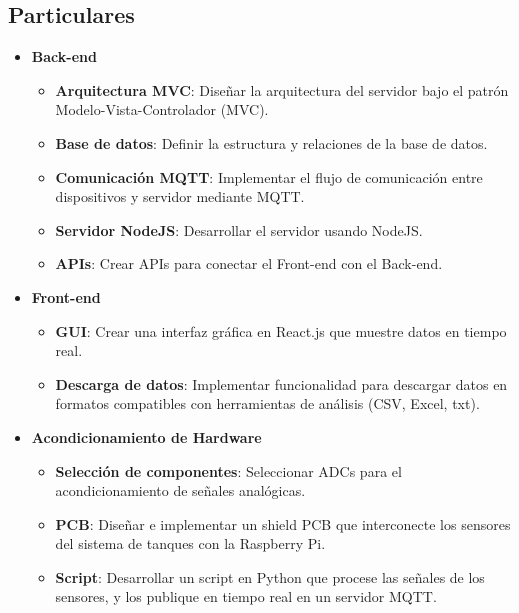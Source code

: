 \subsection{Particulares}
    \begin{itemize}
        \item \textbf{Back-end}
            \begin{itemize}
                \item \textbf{Arquitectura MVC}: Diseñar la arquitectura del servidor bajo el patrón Modelo-Vista-Controlador (MVC).
                \item \textbf{Base de datos}: Definir la estructura y relaciones de la base de datos.
                \item \textbf{Comunicación MQTT}: Implementar el flujo de comunicación entre dispositivos y servidor mediante MQTT.
                \item \textbf{Servidor NodeJS}: Desarrollar el servidor usando NodeJS.
                \item \textbf{APIs}: Crear APIs para conectar el Front-end con el Back-end.
            \end{itemize}
        \item \textbf{Front-end}
            \begin{itemize}
                \item \textbf{GUI}: Crear una interfaz gráfica en React.js que muestre datos en tiempo real.
                \item \textbf{Descarga de datos}: Implementar funcionalidad para descargar datos en formatos compatibles con herramientas de análisis (CSV, Excel, txt).
            \end{itemize}
        \item \textbf{Acondicionamiento de Hardware}
            \begin{itemize}
                \item \textbf{Selección de componentes}: Seleccionar ADCs para el acondicionamiento de señales analógicas.
                \item \textbf{PCB}: Diseñar e implementar un shield PCB que interconecte los sensores del sistema de tanques con la Raspberry Pi.
                \item \textbf{Script}: Desarrollar un script en Python que procese las señales de los sensores, y los publique en tiempo real en un servidor MQTT.
            \end{itemize}
    \end{itemize}